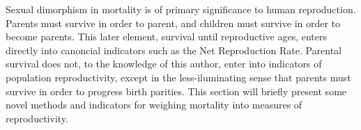 
Sexual dimorphism in mortality is of primary significance to human reproduction.
Parents must survive in order to parent, and children must survive in order to
become parents. This later element, survival until reproductive ages, enters
directly into canoncial indicators such as the Net Reproduction Rate. Parental
survival does not, to the knowledge of this author, enter into indicators of
population reproductivity, except in the less-iluminating
sense that parents must survive in order to progress birth parities. This section will briefly present 
some novel methods and indicators for weighing mortality into measures of
reproductivity.

